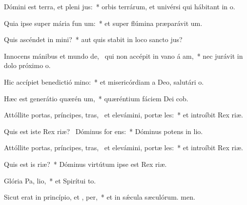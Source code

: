 \item Dómini est terra, et pleni jus:~* orbis terrárum, et univérsi qui hábitant in o.
\item Quia ipse super mária fun um:~* et super flúmina præparávit um.
\item Quis ascéndet in  mini?~* aut quis stabit in loco sancto jus?
\item Innocens mánibus et mundo de,~\pscross{} qui non accépit in vano á am,~* nec jurávit in dolo próximo o.
\item Hic accípiet benedictió  mino:~* et misericórdiam a Deo, salutári o.
\item Hæc est generátio quærén um,~* quæréntium fáciem Dei cob.
\item Attóllite portas, príncipes, tras,~\pscross{} et elevámini, portæ les:~* et introíbit Rex riæ.
\item Quis est iste Rex riæ?~\pscross{} Dóminus for  ens:~* Dóminus potens in lio.
\item Attóllite portas, príncipes, tras,~\pscross{} et elevámini, portæ les:~* et introíbit Rex riæ.
\item Quis est is  riæ?~* Dóminus virtútum ipse est Rex riæ.
\item Glória Pa,  lio,~* et Spirítui to.
\item Sicut erat in princípio, et ,  per,~* et in sǽcula sæculórum. men.

